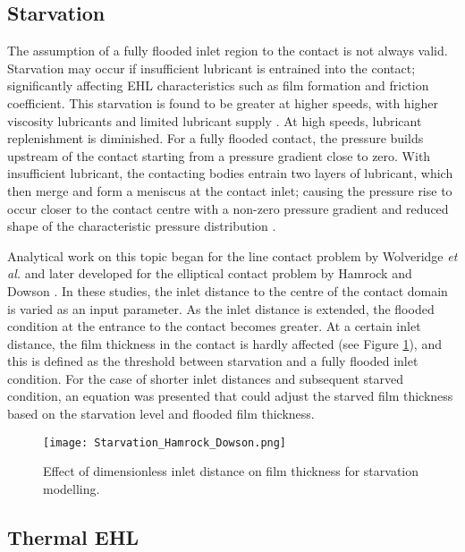 \subsection{Starvation}

The assumption of a fully flooded inlet region to the contact is not always valid. Starvation may occur if insufficient lubricant is entrained into the contact; significantly affecting EHL characteristics such as film formation and friction coefficient. This starvation is found to be greater at higher speeds, with higher viscosity lubricants and limited lubricant supply \cite{Chevalier1995}. At high speeds, lubricant replenishment is diminished. For a fully flooded contact, the pressure builds upstream of the contact starting from a pressure gradient close to zero. With insufficient lubricant, the contacting bodies entrain two layers of lubricant, which then merge and form a meniscus at the contact inlet; causing the pressure rise to occur closer to the contact centre with a non-zero pressure gradient and reduced shape of the characteristic pressure distribution \cite{Lugt2011}.

Analytical work on this topic began for the line contact problem by Wolveridge \textit{et al.} \cite{Wolveridge1970a} and later developed for the elliptical contact problem by Hamrock and Dowson \cite{Hamrock1976}. In these studies, the inlet distance to the centre of the contact domain is varied as an input parameter. As the inlet distance is extended, the flooded condition at the entrance to the contact becomes greater. At a certain inlet distance, the film thickness in the contact is hardly affected (see Figure \ref{Starvation_Hamrock_Dowson}), and this is defined as the threshold between starvation and a fully flooded inlet condition. For the case of shorter inlet distances and subsequent starved condition, an equation was presented that could adjust the starved film thickness based on the starvation level and flooded film thickness.

\begin{figure}
	\centerline{\texttt{[image: Starvation\_Hamrock\_Dowson.png]}}
	\caption [Effect of dimensionless inlet distance on film thickness for starvation modelling.]{Effect of dimensionless inlet distance on film thickness for starvation modelling. \cite{Hamrock1976}}
	\label{Starvation_Hamrock_Dowson}
\end{figure}

\subsection{Thermal EHL}

